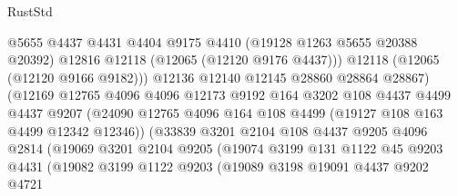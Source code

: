 \begin{lexlean}{RustStd}
\begin{coremodule}
                                @5655
                                @4437
                                @4431
                                @4404
                                @9175
                                @4410
                                (@19128 @1263 @5655 @20388 @20392)
                                @12816
                                @12118
                                (@12065 (@12120 @9176 @4437)))
                              @12118
                              (@12065 (@12120 @9166 @9182)))
                            @12136
                            @12140
                            @12145
                            @28860
                            @28864
                            @28867)
                          (@12169
                            @12765
                            @4096
                            @4096
                            @12173
                            @9192
                            @164
                            @3202
                            @108
                            @4437
                            @4499
                            @4437
                            @9207
                            (@24090
                              @12765
                              @4096
                              @164
                              @108
                              @4499
                              (@19127 @108 @163 @4499 @12342 @12346))
                            (@33839
                              @3201
                              @2104
                              @108
                              @4437
                              @9205
                              @4096
                              @2814
                              (@19069
                                @3201
                                @2104
                                @9205
                                (@19074
                                  @3199
                                  @131
                                  @1122
                                  @45
                                  @9203
                                  @4431
                                  (@19082
                                    @3199
                                    @1122
                                    @9203
                                    (@19089
                                      @3198
                                      @19091
                                      @4437
                                      @9202
                                      @4721

\end{coremodule}
\end{lexlean}
